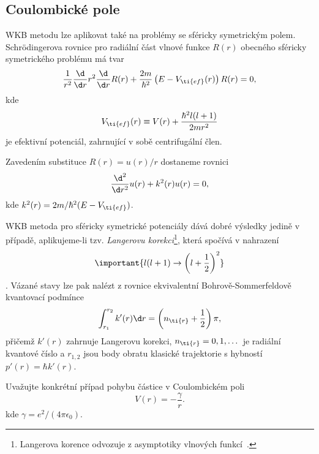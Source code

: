 \subsection{Coulombické pole}	
    WKB metodu lze aplikovat také na problémy se sféricky symetrickým polem.
    Schrödingerova rovnice pro radiální část vlnové funkce $R(r)$ obecného sféricky symetrického problému má tvar
    \begin{equation}
        \frac{1}{r^{2}}\frac{\d}{\d r}r^{2}\frac{\d}{\d r}R(r)+\frac{2m}{\hbar^{2}}\left(E-V_{\ti{ef}}(r)\right)R(r)
            =0,
    \end{equation}
    kde 
    \begin{equation}
    V_{\ti{ef}}(r)
        \equiv V(r)+\frac{\hbar^{2}l(l+1)}{2mr^{2}}
    \end{equation}
    je efektivní potenciál, zahrnující v sobě centrifugální člen.
    
    Zavedením substituce $R(r)=u(r)/r$ dostaneme rovnici
    \begin{equation}
        \frac{\d^{2}}{\d r^{2}}u(r)+k^{2}(r)u(r)
            =0,
    \end{equation}
    kde $k^{2}(r)=2m/\hbar^{2}(E-V_{\ti{ef}})$.
    
    WKB metoda pro sféricky symetrické potenciály dává dobré výsledky jedině v případě, 
    aplikujeme-li tzv. \emph{Langerovu korekci}\footnote{
        Langerova korence odvozuje z asymptotiky vlnových funkcí~\cite{Langer1937}.
    }, která spočívá v nahrazení 
    \begin{equation}
        \important{l(l+1)\rightarrow\left(l+\frac{1}{2}\right)^{2}}
    \end{equation}
    .
    Vázané stavy lze pak nalézt z rovnice ekvivalentní Bohrově-Sommerfeldově kvantovací podmínce
    \begin{equation}
        \int_{r_{1}}^{r_{2}}k'(r)\d r
            =\left(n_{\ti{r}}+\frac{1}{2}\right)\pi,
    \end{equation}
    přičemž $k'(r)$ zahrnuje Langerovu korekci, $n_{\ti{r}}=0,1,\dots$ je radiální kvantové číslo a
    $r_{1,2}$ jsou body obratu klasické trajektorie s hybností $p'(r)=\hbar k'(r)$.
    
    Uvažujte konkrétní případ pohybu částice v Coulombickém poli
    \begin{equation}
        V(r)=-\frac{\gamma}{r}.
    \end{equation}
    kde $\gamma=e^{2}/(4\pi\epsilon_{0})$.
    
